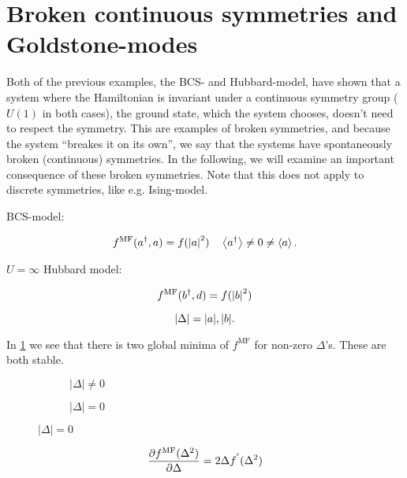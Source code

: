 \section[Broken symmetries]{Broken continuous symmetries and Goldstone-modes}

Both of the previous examples, the BCS- and Hubbard-model, have shown that a system where the Hamiltonian is invariant under a continuous symmetry group ($U(1)$ in both cases), the ground state, which the system chooses, doesn't need to respect the symmetry. This are examples of broken symmetries, and because the system ``breakes it on its own'', we say that the systems have spontaneously broken (continuous) symmetries. In the following, we will examine an important consequence of these broken symmetries. Note that this does not apply to discrete symmetries, like e.g. Ising-model.  

BCS-model: 

\begin{equation*}
    f^{\text{MF}}(a^{\dagger}, a) = f(\abs{a}^2) \quad \expval{a^{\dagger}} \neq 0 \neq \expval{a}.
\end{equation*}

$U = \infty$ Hubbard model: 

\begin{equation*}
    f^{\text{MF}}(b^{\dagger}, d) = f(\abs{b}^2) 
\end{equation*}

\begin{equation*}
    \abs{\Delta} = \abs{a}, \abs{b}. 
\end{equation*}

In \cref{fig:free_broken1} we see that there is two global minima of $f^{\text{MF}}$ for non-zero $\Delta$'s. These are both stable. 
\begin{figure}
	\centering
	\begin{subfigure}{0.4\textwidth}    
		
		\caption{$|\Delta| \ne 0$}
		\label{fig:free_broken1}
	\end{subfigure}
	\hfill
	\begin{subfigure}{0.4\textwidth}
		
		\caption{$|\Delta| = 0$}
		\label{fig:free_broken_2}	
	\end{subfigure}
	\label{fig:free_broken}
\end{figure}

\begin{equation*}
    \pdv{f^{\text{MF}}(\Delta^2)}{\Delta} = 2\Delta f^{'}(\Delta^2) 
\end{equation*}

